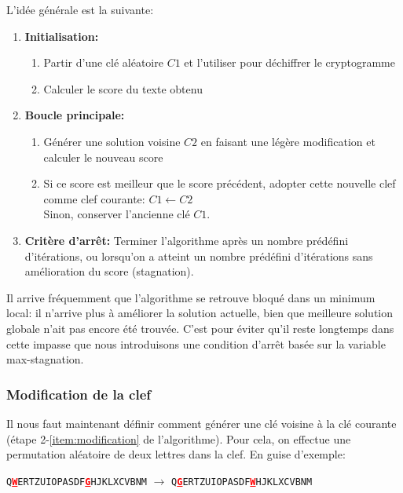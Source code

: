 \documentclass[a4paper]{article}
\newcommand{\highlight}[1]{\textbf{\textcolor{red}{\underline{#1}}}}
\begin{document}
L’idée générale est la suivante:
\begin{enumerate}
    \item \textbf{Initialisation:}
    \begin{enumerate}
        \item Partir d'une clé aléatoire $C1$ et l'utiliser pour déchiffrer le cryptogramme
        \item Calculer le score du texte obtenu
    \end{enumerate}
    \item \textbf{Boucle principale:}
    \begin{enumerate}[label= (\alph*)]
        \item \label{item:modification} Générer une solution voisine $C2$ en faisant une légère modification et calculer le nouveau score
        \item Si ce score est meilleur que le score précédent, adopter cette nouvelle clef comme clef courante: $C1 \leftarrow C2$\\
              Sinon, conserver l’ancienne clé $C1$.
    \end{enumerate}
    \item \textbf{Critère d'arrêt:} Terminer l'algorithme après un nombre prédéfini d'itérations, ou lorsqu'on a atteint un nombre prédéfini d'itérations sans amélioration du score (stagnation).
\end{enumerate}

Il arrive fréquemment que l’algorithme se retrouve bloqué dans un minimum local: il n’arrive plus à améliorer la solution actuelle, bien que meilleure solution globale n’ait pas encore été trouvée.  
C'est pour éviter qu'il reste longtemps dans cette impasse que nous introduisons une condition d'arrêt basée sur la variable max-stagnation.

\subsubsection*{Modification de la clef}\label{sec:modification_de_la_clef}

Il nous faut maintenant définir comment générer une clé voisine à la clé courante (étape 2-\ref{item:modification} de l’algorithme).  
Pour cela, on effectue une permutation aléatoire de deux lettres dans la clef. En guise d'exemple:
\begin{center}
\texttt{Q\highlight{W}ERTZUIOPASDF\highlight{G}HJKLXCVBNM} $\rightarrow$ \texttt{Q\highlight{G}ERTZUIOPASDF\highlight{W}HJKLXCVBNM}
\end{center}
\end{document}
